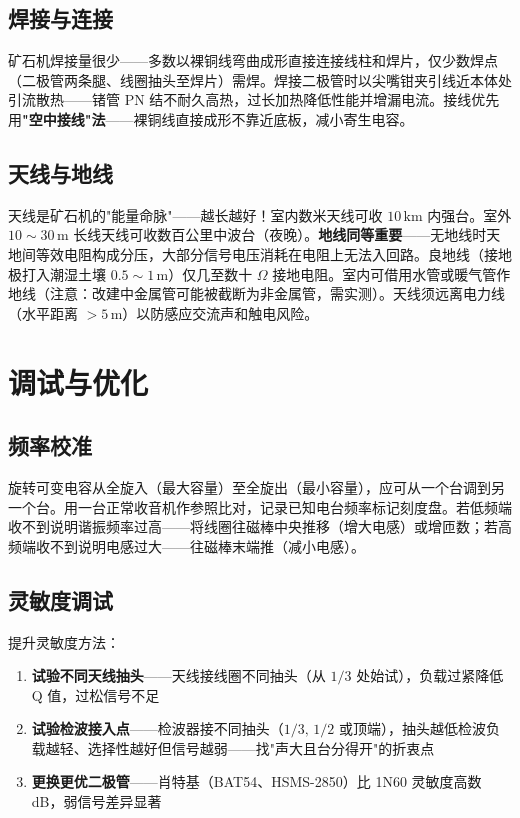 \documentclass[12pt,UTF8]{ctexbook}
\begin{document}
\subsection{焊接与连接}

矿石机焊接量很少——多数以裸铜线弯曲成形直接连接线柱和焊片，仅少数焊点（二极管两条腿、线圈抽头至焊片）需焊。焊接二极管时以尖嘴钳夹引线近本体处引流散热——锗管 PN 结不耐久高热，过长加热降低性能并增漏电流。接线优先用\textbf{"空中接线"法}——裸铜线直接成形不靠近底板，减小寄生电容。

\subsection{天线与地线}

天线是矿石机的"能量命脉"——越长越好！室内数米天线可收 $10\,\mathrm{km}$ 内强台。室外 $10\sim30\,\mathrm{m}$ 长线天线可收数百公里中波台（夜晚）。\textbf{地线同等重要}——无地线时天地间等效电阻构成分压，大部分信号电压消耗在电阻上无法入回路。良地线（接地极打入潮湿土壤 $0.5\sim1\,\mathrm{m}$）仅几至数十 $\Omega$ 接地电阻。室内可借用水管或暖气管作地线（注意：改建中金属管可能被截断为非金属管，需实测）。天线须远离电力线（水平距离 $>5\,\mathrm{m}$）以防感应交流声和触电风险。

\section{调试与优化}
\label{sec:crystal_debugging}

\subsection{频率校准}

旋转可变电容从全旋入（最大容量）至全旋出（最小容量），应可从一个台调到另一个台。用一台正常收音机作参照比对，记录已知电台频率标记刻度盘。若低频端收不到说明谐振频率过高——将线圈往磁棒中央推移（增大电感）或增匝数；若高频端收不到说明电感过大——往磁棒末端推（减小电感）。

\subsection{灵敏度调试}

提升灵敏度方法：
\begin{enumerate}
\item \textbf{试验不同天线抽头}——天线接线圈不同抽头（从 $1/3$ 处始试），负载过紧降低 Q 值，过松信号不足
\item \textbf{试验检波接入点}——检波器接不同抽头（$1/3,\,1/2$ 或顶端），抽头越低检波负载越轻、选择性越好但信号越弱——找"声大且台分得开"的折衷点
\item \textbf{更换更优二极管}——肖特基（BAT54、HSMS-2850）比 1N60 灵敏度高数 dB，弱信号差异显著
\end{enumerate}
\end{document}

